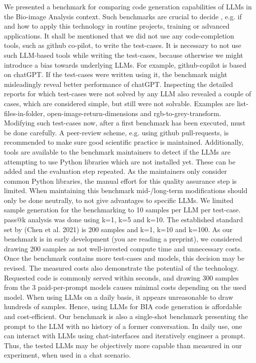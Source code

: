 \documentclass{ecai}
\begin{document}
We presented a benchmark for comparing code generation capabilities of LLMs in the Bio-image Analysis context. Such benchmarks are crucial to decide , e.g. if and how to apply this technology in routine projects, training or advanced applications. 
It shall be mentioned that we did not use any code-completion tools, such as github co-pilot, to write the test-cases. It is necessary to not use such LLM-based tools while writing the test-cases, because otherwise we might introduce a bias towards underlying LLMs. For example, github-copilot is based on chatGPT. If the test-cases were written using it, the benchmark might misleadingly reveal better performance of chatGPT.
Inspecting the detailed reports for which test-cases were not solved by any LLM also revealed a couple of cases, which are considered simple, but still were not solvable. Examples are list-files-in-folder, open-image-return-dimensions and rgb-to-grey-transform. Modifying such test-cases now, after a first benchmark has been executed, must be done carefully. A peer-review scheme, e.g. using github pull-requests, is recommended to make sure good scientific practice is maintained. Additionally, tools are available to the benchmark maintainers to detect if the LLMs are attempting to use Python libraries which are not installed yet. These can be added and the evaluation step repeated. As the maintainers only consider common Python libraries, the manual effort for this quality assurance step is limited. When maintaining this benchmark mid-/long-term modifications should only be done neutrally, to not give advantages to specific LLMs.
We limited sample generation for the benchmarking to 10 samples per LLM per test-case. pass@k analysis was done using k=1, k=5 and k=10. The established standard set by (Chen et al. 2021) is 200 samples and k=1, k=10 and k=100. As our benchmark is in early development (you are reading a preprint), we considered drawing 200 samples as not well-invested compute time and unnecessary costs. Once the benchmark contains more test-cases and models, this decision may be revised. 
The measured costs also demonstrate the potential of the technology. Requested code is commonly served within seconds, and drawing 300 samples from the 3 paid-per-prompt models causes minimal costs depending on the used model. When using LLMs on a daily basis, it appears unreasonable to draw hundreds of samples. Hence, using LLMs for BIA code generation is affordable and cost-efficient. 
Our benchmark is also a single-shot benchmark presenting the prompt to the LLM with no history of a former conversation. In daily use, one can interact with LLMs using chat-interfaces and iteratively engineer a prompt. Thus, the tested LLMs may be objectively more capable than measured in our experiment, when used in a chat scenario.
\end{document}
